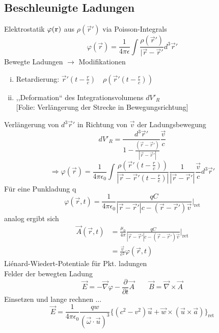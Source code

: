 \documentclass[titlepage,12pt,a4paper,ngerman]{report}
\newcommand{\tx}[1]{\textrm{#1}}
\newcommand{\folie}[1]{\color{gray}[Folie: #1]\color{black}}
\begin{document}


\subsection{Beschleunigte Ladungen}
Elektrostatik $ \varphi(\verb|r|) $ aus $ \rho(\vec{r}') $ via Poisson-Integrals
$$\varphi(\vec{r}) = \frac{1}{4 \pi \epsilon} \int \frac{\rho(\vec{r}')}{|\vec{r} - \vec{r}'} d^3 \vec{r}'$$
Bewegte Ladungen $ \rightarrow $ Modifikationen
\begin{enumerate}[i)]
	\item Retardierung: $ \vec{r}' (t-\frac{r}{c}) \quad \rho(\vec{r}'(t-\frac{r}{c})) $
	\item ,,Deformation`` des Integrationsvolumens $ dV'_{R} $\\
	\folie{Verlängerung der Strecke in Bewegungsrichtung}
\end{enumerate}
Verlängerung von $ d^3\vec{r}' $ in Richtung von $ \vec{v} $ der Ladungsbewegung
$$ dV'_R = \frac{d^3 \vec{r}'}{1 - \frac{(\vec{r} - \vec{r}')}{|\vec{r}-\vec{r}'|}} \frac{\vec{v}}{c}$$
$$\Rightarrow \varphi(\vec{r}) = \frac{1}{4 \pi \epsilon_0} \int\frac{\rho(\vec{r}' ( t-\frac{r}{c}))}{|\vec{r} - \vec{r}'(t-\frac{r}{c}) |} \frac{1}{|\vec{r}-\vec{r}'|} \frac{\vec{v}}{c} d^3 \vec{r}'$$
Für eine Punkladung q
$$\varphi(\vec{r},t) = \frac{1}{4\pi \epsilon_0} \frac{qC}{|\vec{r} - \vec{r}'|c - (\vec{r} - \vec{r}')\vec{v}} \bigg|_{\tx{ret}}$$
analog ergibt sich
\begin{align*}
\vec{A}(\vec{r},t) &= \frac{\mu_0}{4\pi} \frac{qC}{|\vec{r} - \vec{r}'| c - (\vec{r} - \vec{r}') \vec{v}}\bigg|_{\tx{ret}}\\
&= \frac{\vec{v}}{c^2} \varphi(\vec{r},t)
\end{align*}
Liénard-Wiedert-Potentiale für Pkt. ladungen\\[5pt]
Felder der bewegten Ladung
$$\vec{E} = - \vec{\nabla} \varphi - \frac{\partial }{\partial t} \vec{A} \qquad \vec{B} = \vec{\nabla} \times \vec{A}$$
Einsetzen und lange rechnen $ \dots $
$$\vec{E} = \frac{1}{4 \pi \epsilon_0} \frac{q w}{(\vec{\omega} \cdot \vec{u})^3} \bigg\{ (c^2 - v^2) \vec{u} + \vec{w} \times (\vec{u} \times \vec{a}) \bigg\}_{\tx{ret}}$$
\end{document}
